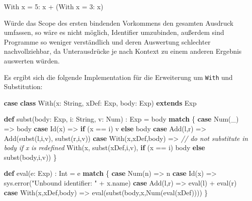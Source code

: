 \documentclass[]{article}
\newenvironment{Shaded}{}{}
\newcommand{\CommentTok}[1]{\textcolor[rgb]{0.38,0.63,0.69}{\textit{#1}}}
\newcommand{\DecValTok}[1]{\textcolor[rgb]{0.25,0.63,0.44}{#1}}
\newcommand{\FunctionTok}[1]{\textcolor[rgb]{0.02,0.16,0.49}{#1}}
\newcommand{\KeywordTok}[1]{\textcolor[rgb]{0.00,0.44,0.13}{\textbf{#1}}}
\newcommand{\NormalTok}[1]{#1}
\newcommand{\StringTok}[1]{\textcolor[rgb]{0.25,0.44,0.63}{#1}}
\begin{document}
\begin{Shaded}
\begin{Highlighting}[]
\NormalTok{With x = }\DecValTok{5}\NormalTok{:}
\NormalTok{   x + (With x = }\DecValTok{3}\NormalTok{: x)}
\end{Highlighting}
\end{Shaded}

Würde das Scope des ersten bindenden Vorkommens den gesamten Ausdruck
umfassen, so wäre es nicht möglich, Identifier umzubinden, außerdem sind
Programme so weniger verständlich und deren Auswertung schlechter
nachvollziehbar, da Unterausdrücke je nach Kontext zu einem anderen
Ergebnis auswerten würden.

Es ergibt sich die folgende Implementation für die Erweiterung um
\texttt{With} und Substitution:

\begin{Shaded}
\begin{Highlighting}[]
\KeywordTok{case} \KeywordTok{class} \FunctionTok{With}\NormalTok{(x: String, xDef: Exp, body: Exp) }\KeywordTok{extends}\NormalTok{ Exp}

\KeywordTok{def} \FunctionTok{subst}\NormalTok{(body: Exp, i: String, v: Num) : Exp = body }\KeywordTok{match}\NormalTok{ \{}
  \KeywordTok{case} \FunctionTok{Num}\NormalTok{(\_) =\textgreater{} body}
  \KeywordTok{case} \FunctionTok{Id}\NormalTok{(x) =\textgreater{} }\KeywordTok{if}\NormalTok{ (x == i) v }\KeywordTok{else}\NormalTok{ body}
  \KeywordTok{case} \FunctionTok{Add}\NormalTok{(l,r) =\textgreater{} }\FunctionTok{Add}\NormalTok{(}\FunctionTok{subst}\NormalTok{(l,i,v), }\FunctionTok{subst}\NormalTok{(r,i,v))}
  \KeywordTok{case} \FunctionTok{With}\NormalTok{(x,xDef,body) =\textgreater{}  }\CommentTok{// do not substitute in body if x is redefined}
    \FunctionTok{With}\NormalTok{(x, }\FunctionTok{subst}\NormalTok{(xDef,i,v), }\KeywordTok{if}\NormalTok{ (x == i) body }\KeywordTok{else} \FunctionTok{subst}\NormalTok{(body,i,v))}
\NormalTok{\}}

\KeywordTok{def} \FunctionTok{eval}\NormalTok{(e: Exp) : Int = e }\KeywordTok{match}\NormalTok{ \{}
  \KeywordTok{case} \FunctionTok{Num}\NormalTok{(n) =\textgreater{} n}
  \KeywordTok{case} \FunctionTok{Id}\NormalTok{(x) =\textgreater{} sys.}\FunctionTok{error}\NormalTok{(}\StringTok{"Unbound identifier: "}\NormalTok{ + x.}\FunctionTok{name}\NormalTok{)}
  \KeywordTok{case} \FunctionTok{Add}\NormalTok{(l,r) =\textgreater{} }\FunctionTok{eval}\NormalTok{(l) + }\FunctionTok{eval}\NormalTok{(r)}
  \KeywordTok{case} \FunctionTok{With}\NormalTok{(x,xDef,body) =\textgreater{} }\FunctionTok{eval}\NormalTok{(}\FunctionTok{subst}\NormalTok{(body,x,}\FunctionTok{Num}\NormalTok{(}\FunctionTok{eval}\NormalTok{(xDef))))}
\NormalTok{\}}


\end{Highlighting}
\end{Shaded}
\end{document}
